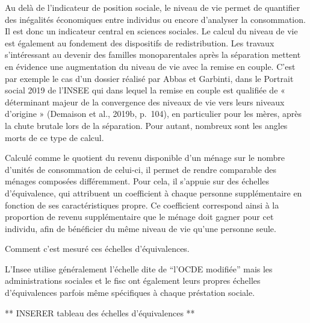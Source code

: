 \documentclass[
  12pt,
]{book}
\begin{document}
Au delà de l'indicateur de position sociale, le niveau de vie permet de
quantifier des inégalités économiques entre individus ou encore
d'analyser la consommation. Il est donc un indicateur central en
sciences sociales. Le calcul du niveau de vie est également au fondement
des dispositifs de redistribution. Les travaux s'intéressant au devenir
des familles monoparentales après la séparation mettent en évidence une
augmentation du niveau de vie avec la remise en couple. C'est par
exemple le cas d'un dossier réalisé par Abbas et Garbinti, dans le
Portrait social 2019 de l'INSEE qui dans lequel la remise en couple est
qualifiée de « déterminant majeur de la convergence des niveaux de vie
vers leurs niveaux d'origine » (Demaison et al., 2019b, p.~104), en
particulier pour les mères, après la chute brutale lors de la
séparation. Pour autant, nombreux sont les angles morts de ce type de
calcul.

Calculé comme le quotient du revenu disponible d'un ménage sur le nombre
d'unités de consommation de celui-ci, il permet de rendre comparable des
ménages composées différemment. Pour cela, il s'appuie sur des échelles
d'équivalence, qui attribuent un coefficient à chaque personne
supplémentaire en fonction de ses caractéristiques propre. Ce
coefficient correspond ainsi à la proportion de revenu supplémentaire
que le ménage doit gagner pour cet individu, afin de bénéficier du même
niveau de vie qu'une personne seule.

Comment c'est mesuré ces échelles d'équivalences.

L'Insee utilise généralement l'échelle dite de ``l'OCDE modifiée'' mais
les administrations sociales et le fisc ont également leurs propres
échelles d'équivalences parfois même spécifiques à chaque préstation
sociale.

** INSERER tableau des échelles d'équivalences **
\end{document}
